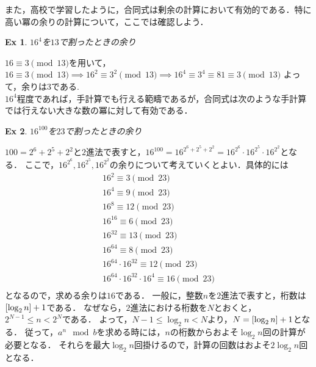 \documentclass{jsarticle}
\DeclarePairedDelimiter{\sbra}{\lbrack}{\rbrack} %
\newtheorem{ex}{Ex}
\begin{document}
    また，高校で学習したように，合同式は剰余の計算において有効的である．特に高い冪の余りの計算について，ここでは確認しよう．

    \begin{ex}
      $16^4$を$13$で割ったときの余り
    \end{ex}

    $16 \equiv 3 \pmod {13}$を用いて，$16 \equiv 3 \pmod {13} \implies 16^2 \equiv 3^2 \pmod {13} \implies 16^4 \equiv 3^4 \equiv 81 \equiv 3 \pmod {13}$
    よって，余りは$3$である.\\

    $16^4$程度であれば，手計算でも行える範疇であるが，合同式は次のような手計算では行えない大きな数の冪に対して有効である．

    \begin{ex}
      $16^{100}$を$23$で割ったときの余り
    \end{ex}

    $100 = 2^6 + 2^5 + 2^2$と$2$進法で表すと，$16^{100} = 16^{2^6 + 2^5 + 2^2} = 16^{2^6} \cdot 16^{2^5} \cdot 16^{2^2}$となる．
    ここで，$16^{2^6}, 16^{2^5}, 16^{2^2}$の余りについて考えていくとよい．具体的には
    \begin{gather}
      16^2 \equiv 3 \pmod {23} \nonumber \\
      16^4 \equiv 9 \pmod {23} \nonumber \\
      16^8 \equiv 12 \pmod {23} \nonumber \\
      16^{16} \equiv 6 \pmod {23} \nonumber \\
      16^{32} \equiv 13 \pmod {23} \nonumber \\
      16^{64} \equiv 8 \pmod {23} \nonumber \\
      16^{64} \cdot 16^{32} \equiv 12 \pmod {23} \nonumber \\
      16^{64} \cdot 16^{32} \cdot 16^4 \equiv 16 \pmod {23} \nonumber \\
    \end{gather}
    となるので，求める余りは$16$である．
    一般に，整数$n$を$2$進法で表すと，桁数は$\sbra{\log_2 n}+1$である．
    なぜなら，$2$進法における桁数を$N$とおくと，$2^{N-1} \leq n < 2^N$である．
    よって，$N-1 \leq \log_2 n < N$より，$N = \sbra{\log_2 n}+1$となる．
    従って，$a^n \mod b$を求める時には，$n$の桁数からおよそ$\log_2 n$回の計算が必要となる．
    それらを最大$\log_2 n$回掛けるので，計算の回数はおよそ$2\log_2 n$回となる．
    
\end{document}

